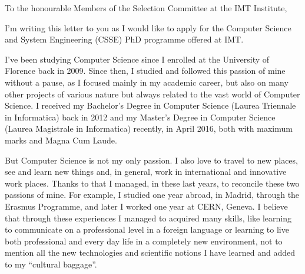\documentclass{article}
\begin{document}
    \hspace*{0.5\linewidth}
    
    To the honourable Members of the Selection Committee at the IMT Institute, \par \bigskip
    
    I'm writing this letter to you as I would like to apply for the Computer Science and System
    Engineering (CSSE) PhD programme offered at IMT. \par \bigskip
    
    I've been studying Computer Science since I enrolled at the University of Florence back in 2009. Since then, I studied and followed this passion of mine without a pause, as I focused mainly in my academic career, but also on many other projects of various nature but always related to the vast world of Computer Science. I received my Bachelor's Degree in Computer Science (Laurea Triennale in Informatica) back in 2012 and my Master's Degree in Computer Science (Laurea Magistrale in Informatica) recently, in April 2016, both with maximum marks and Magna Cum Laude. \par \bigskip
    
    But Computer Science is not my only passion. I also love to travel to new places, see and learn new things and, in general, work in international and innovative work places. Thanks to that I managed, in these last years, to reconcile these two passions of mine. For example, I studied one year abroad, in Madrid, through the Erasmus Programme, and later I worked one year at CERN, Geneva. I believe that through these experiences I managed to acquired many skills, like learning to communicate on a professional level in a foreign language or learning to live both professional and every day life in a completely new environment, not to mention all the new technologies and scientific notions I have learned and added to my ``cultural baggage''. \par \bigskip
    
\end{document}
